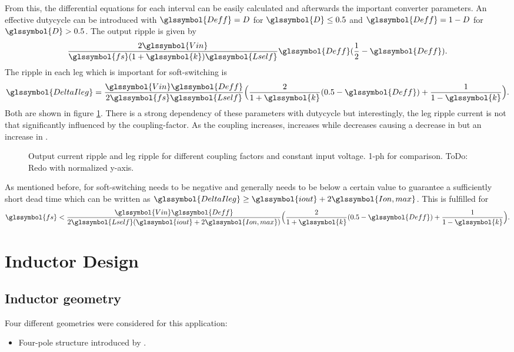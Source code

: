 \documentclass{IPEC2026}
\newcommand{\sbl}[1]{\glssymbol{#1}}
\begin{document}
From this, the differential equations for each interval can be easily calculated and afterwards the important converter parameters. An effective dutycycle \sbl{Deff} can be introduced with $\sbl{Deff} = D$ for $\sbl{D} \leq 0.5$ and $\sbl{Deff} = 1-D$ for $\sbl{D} > 0.5$.
The output ripple is given by
\begin{equation}
  \frac{2\sbl{Vin}}{\sbl{fs}(1+\sbl{k})\sbl{Lself}}\sbl{Deff}(\frac{1}{2}-\sbl{Deff}).
\end{equation}
The ripple in each leg which is important for soft-switching is
\begin{equation}
  \sbl{DeltaIleg} =  \frac{\sbl{Vin}\sbl{Deff}}{2\sbl{fs}\sbl{Lself}} \Bigl (\frac{2}{1+\sbl{k}}(0.5-\sbl{Deff}) + \frac{1}{1-\sbl{k}} \Bigr )  .
\end{equation}
Both are shown in figure \ref{fig:OutputAndLegRipple}. There is a strong dependency of these parameters with dutycycle but interestingly, the leg ripple current is not that significantly influenced by the coupling-factor. As the coupling increases, \sbl{Lout} increases while \sbl{Lm} decreases causing a decrease in \sbl{iout} but an increase in \sbl{im}.
\begin{figure}
  \centering
  
  
  \caption{Output current ripple and leg ripple for different coupling factors and constant input voltage. 1-ph for comparison. ToDo: Redo with normalized y-axis.}
  \label{fig:OutputAndLegRipple}
\end{figure}

As mentioned before, for soft-switching \sbl{Ion} needs to be negative and generally needs to be below a certain value to guarantee a sufficiently short dead time which can be written as $\sbl{DeltaIleg} \geq \sbl{iout}+2\sbl{Ion,max}$. This is fulfilled for
\begin{equation}
    \sbl{fs} < \frac{\sbl{Vin}\sbl{Deff}}{2\sbl{Lself}(\sbl{iout}+2\sbl{Ion,max})} \Bigl (\frac{2}{1+\sbl{k}}(0.5-\sbl{Deff}) + \frac{1}{1-\sbl{k}} \Bigr ).
    \label{eq:ConditionZVS}
\end{equation}


\section{Inductor Design}
\subsection{Inductor geometry}
Four different geometries were considered for this application:
\begin{itemize}
  \item Four-pole structure introduced by  \cite{huaUltrathinCoupledInductor2021}. 
\end{itemize}
\end{document}
